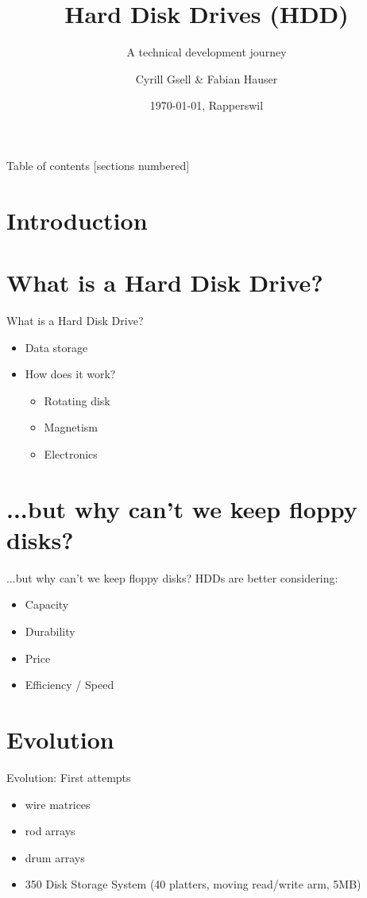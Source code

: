 \documentclass[12pt]{beamer}
\title{Hard Disk Drives (HDD)}
\subtitle{A technical development journey}
\date{\today, Rapperswil}
\author{Cyrill Gsell \& Fabian Hauser}
\institute{Computer Science \\
	TecBEC Presentation FS 2016}
\newlength{\wideitemsep}
\let\olditem\item
\renewcommand{\item}{\setlength{\itemsep}{\wideitemsep}\olditem}
\begin{document}
\maketitle

\begin{frame}{Table of contents}
  [sections numbered]
  \tableofcontents
\end{frame}

\section{Introduction}
\section{What is a Hard Disk Drive?}
\begin{frame}[fragile]{What is a Hard Disk Drive?}
	\begin{itemize}
		\item Data storage
		\item How does it work?
			\begin{itemize}
				\item Rotating disk
				\item Magnetism
				\item Electronics
			\end{itemize}
	\end{itemize}
\end{frame}

\section{...but why can't we keep floppy disks?}
\begin{frame}[fragile]{...but why can't we keep floppy disks?}
	HDDs are better considering:
	\begin{itemize}
		\item Capacity
		\item Durability
		\item Price
		\item Efficiency / Speed
	\end{itemize}		
\end{frame}

\section{Evolution}
\begin{frame}[fragile]{Evolution: First attempts}
	\begin{itemize}
		\item wire matrices
		\item rod arrays
		\item drum arrays
		\item 350 Disk Storage System (40 platters, moving read/write arm, 5MB)
	\end{itemize}
\end{frame}
\end{document}
